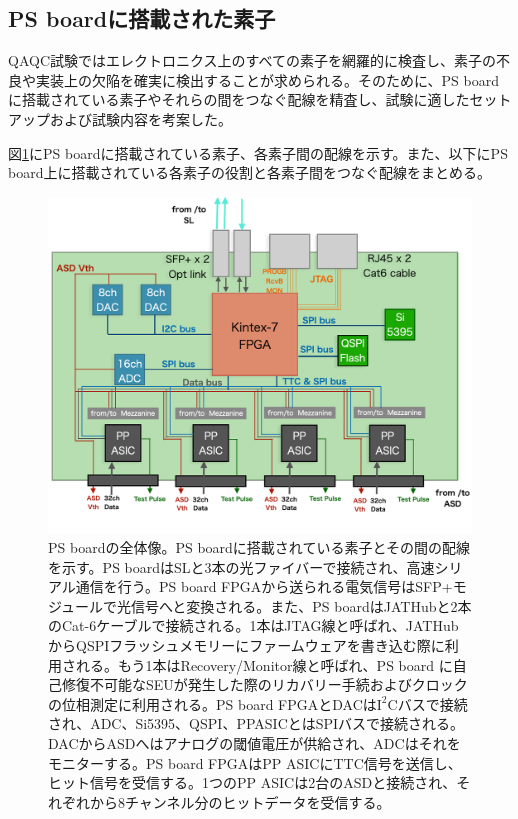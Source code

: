 \subsection{PS boardに搭載された素子}
\label{subsec_PSBelements}
QAQC試験ではエレクトロニクス上のすべての素子を網羅的に検査し、素子の不良や実装上の欠陥を確実に検出することが求められる。そのために、PS boardに搭載されている素子やそれらの間をつなぐ配線を精査し、試験に適したセットアップおよび試験内容を考案した。

図\ref{PSBconcept}にPS boardに搭載されている素子、各素子間の配線を示す。また、以下にPS board上に搭載されている各素子の役割と各素子間をつなぐ配線をまとめる。

\begin{figure} 
\centering
\includegraphics[width=16cm]{fig/QAQC/PSBoverall.png}
\caption[PS boardの全体像]{PS boardの全体像。PS boardに搭載されている素子とその間の配線を示す。PS boardはSLと3本の光ファイバーで接続され、高速シリアル通信を行う。PS board FPGAから送られる電気信号はSFP+モジュールで光信号へと変換される。また、PS boardはJATHubと2本のCat-6ケーブルで接続される。1本はJTAG線と呼ばれ、JATHubからQSPIフラッシュメモリーにファームウェアを書き込む際に利用される。もう1本はRecovery/Monitor線と呼ばれ、PS board に自己修復不可能なSEUが発生した際のリカバリー手続およびクロックの位相測定に利用される。PS board FPGAとDACは$\mathrm{I^{2}C}$バスで接続され、ADC、Si5395、QSPI、PPASICとはSPIバスで接続される。DACからASDへはアナログの閾値電圧が供給され、ADCはそれをモニターする。PS board FPGAはPP ASICにTTC信号を送信し、ヒット信号を受信する。1つのPP ASICは2台のASDと接続され、それぞれから8チャンネル分のヒットデータを受信する。}
\label{PSBconcept}
\end{figure}

